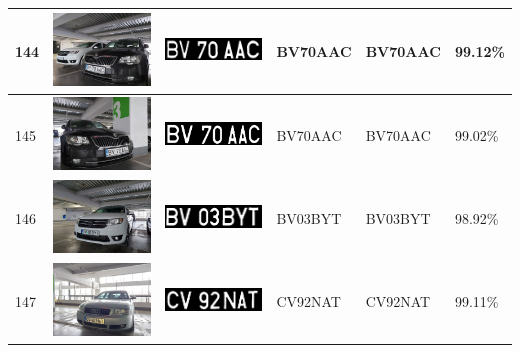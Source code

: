\documentclass[a4paper,12pt]{report}
\begin{document}
\begin{longtable}{| m{0.6cm} | m{3cm} | m{3cm} | m{1.8cm} | m{1.8cm} | m{1.8cm} |}
    144 & \includegraphics[width=3cm,keepaspectratio]{dataset/84_d1.jpg}  & \includegraphics[width=3cm,keepaspectratio]{segmentari/144.jpg} & BV70AAC             & BV70AAC              & 99.12\%    \\ \hline
    145 & \includegraphics[width=3cm,keepaspectratio]{dataset/84_s1.jpg}  & \includegraphics[width=3cm,keepaspectratio]{segmentari/145.jpg} & BV70AAC             & BV70AAC              & 99.02\%    \\ \hline
    146 & \includegraphics[width=3cm,keepaspectratio]{dataset/85_d1.jpg}  & \includegraphics[width=3cm,keepaspectratio]{segmentari/146.jpg} & BV03BYT             & BV03BYT              & 98.92\%    \\ \hline
    147 & \includegraphics[width=3cm,keepaspectratio]{dataset/86_d1.jpg}  & \includegraphics[width=3cm,keepaspectratio]{segmentari/147.jpg} & CV92NAT             & CV92NAT              & 99.11\%    \\ \hline

\end{longtable}
\end{document}
